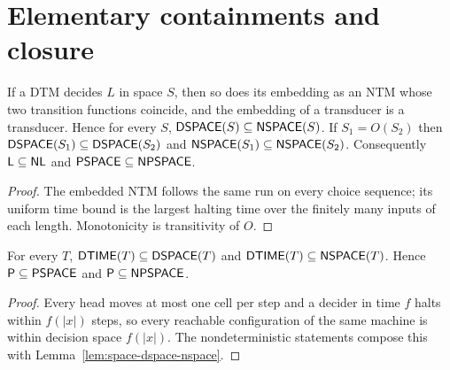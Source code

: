 \section{Elementary containments and closure}

\begin{lemma}
  \label{lem:space-dspace-nspace}
  \leanok
  If a DTM decides $L$ in space $S$, then so does its embedding as an NTM whose
  two transition functions coincide, and the embedding of a transducer is a
  transducer. Hence for every $S$, $\mathsf{DSPACE}(S) \subseteq \mathsf{NSPACE}(S)$.
  If $S_1 = O(S_2)$ then $\mathsf{DSPACE}(S_1) \subseteq \mathsf{DSPACE}(S_2)$ and
  $\mathsf{NSPACE}(S_1) \subseteq \mathsf{NSPACE}(S_2)$. Consequently
  $\mathsf{L} \subseteq \mathsf{NL}$ and $\mathsf{PSPACE} \subseteq \mathsf{NPSPACE}$.
\end{lemma}
\begin{proof}
  \leanok
  The embedded NTM follows the same run on every choice sequence; its uniform
  time bound is the largest halting time over the finitely many inputs of each
  length. Monotonicity is transitivity of $O$.
\end{proof}

\begin{proposition}
  \label{prop:space-dtime-dspace}
  \leanok
  For every $T$, $\mathsf{DTIME}(T) \subseteq \mathsf{DSPACE}(T)$ and
  $\mathsf{DTIME}(T) \subseteq \mathsf{NSPACE}(T)$. Hence
  $\mathsf{P} \subseteq \mathsf{PSPACE}$ and $\mathsf{P} \subseteq \mathsf{NPSPACE}$.
\end{proposition}
\begin{proof}
  \leanok
  Every head moves at most one cell per step and a decider in time $f$ halts
  within $f(|x|)$ steps, so every reachable configuration of the same machine
  is within decision space $f(|x|)$. The nondeterministic statements compose
  this with Lemma~\ref{lem:space-dspace-nspace}.
\end{proof}

